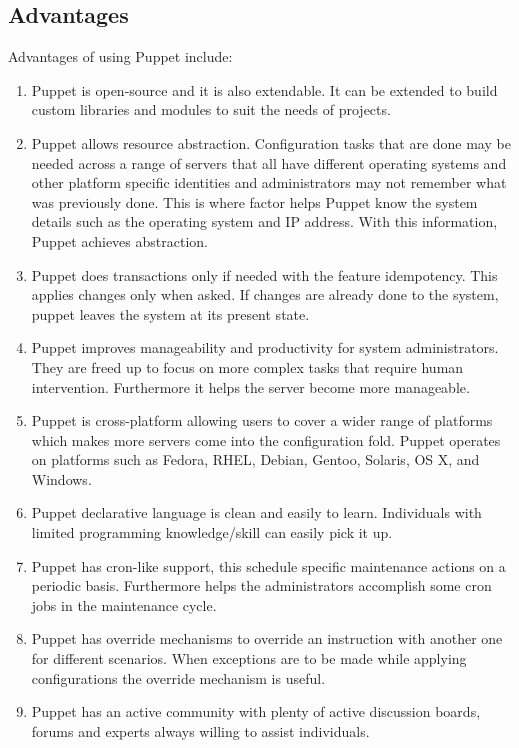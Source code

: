 \documentclass[a4paper, 12pt]{article}
\begin{document}
\subsection{Advantages}
Advantages of using Puppet include:
\begin{enumerate}
\item
Puppet is open-source and it is also extendable. It can be extended to build custom libraries and modules to suit the needs of projects.
\item
Puppet allows resource abstraction. Configuration tasks that are done may be needed across a range of servers that all have different operating systems and other platform specific identities and administrators may not remember what was previously done. This is where factor helps Puppet know the system details such as the operating system and IP address. With this information, Puppet achieves abstraction.
\item
Puppet does transactions only if needed with the feature idempotency. This applies changes only when asked. If changes are already done to the system, puppet leaves the system at its present state.
\item
Puppet improves manageability and productivity for system administrators. They are freed up to focus on more complex tasks that require human intervention. Furthermore it helps the server become more manageable.
\item
Puppet is cross-platform allowing users to cover a wider range of platforms which makes more servers come into the configuration fold. Puppet operates on platforms such as Fedora, RHEL, Debian, Gentoo, Solaris, OS X, and Windows.
\item
Puppet declarative language is clean and easily to learn. Individuals with limited programming knowledge/skill can easily pick it up.
\item
Puppet has cron-like support, this schedule specific maintenance actions on a periodic basis. Furthermore helps the administrators accomplish some cron jobs in the maintenance cycle.
\item
Puppet has override mechanisms to override an instruction with another one for different scenarios. When exceptions are to be made while applying configurations the override mechanism is useful. 
\item
Puppet has an active community with plenty of active discussion boards, forums and experts always willing to assist individuals.
\end{enumerate}
\end{document}
